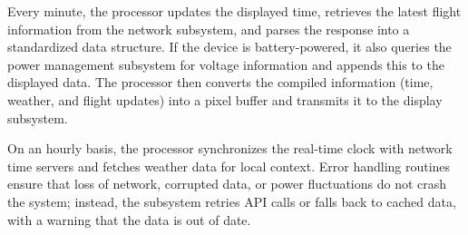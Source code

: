 Every minute, the processor updates the displayed time,
retrieves the latest flight information from the network
subsystem, and parses the response into a standardized
data structure. If the device is battery-powered, it
also queries the power management subsystem for voltage
information and appends this to the displayed data.
The processor then converts the compiled information
(time, weather, and flight updates) into a pixel buffer
and transmits it to the display subsystem.

On an hourly basis, the processor synchronizes the
real-time clock with network time servers and fetches
weather data for local context. Error handling
routines ensure that loss of network, corrupted data,
or power fluctuations do not crash the system; instead,
the subsystem retries API calls or falls back to cached
data, with a warning that the data is out of date.


